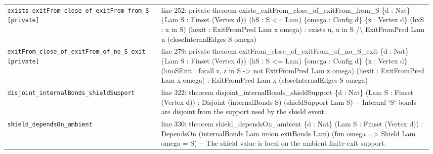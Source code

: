 \documentclass[10pt]{article}
\begin{document}
\begin{longtable}{>{\raggedright\arraybackslash}p{} >{\raggedright\arraybackslash}p{}}
\texttt{exists\_\allowbreak{}exitFrom\_\allowbreak{}close\_\allowbreak{}of\_\allowbreak{}exitFrom\_\allowbreak{}from\_\allowbreak{}S [private]} & {\ttfamily\scriptsize line 252:\allowbreak{} private theorem exists\_\allowbreak{}exitFrom\_\allowbreak{}close\_\allowbreak{}of\_\allowbreak{}exitFrom\_\allowbreak{}from\_\allowbreak{}S \{d :\allowbreak{} Nat\} \{Lam S :\allowbreak{} Finset (\allowbreak{}Vertex d)\allowbreak{}\} (\allowbreak{}hS :\allowbreak{} S <=\allowbreak{} Lam)\allowbreak{} \{omega :\allowbreak{} Config d\} \{x :\allowbreak{} Vertex d\} (\allowbreak{}hxS :\allowbreak{} x in S)\allowbreak{} (\allowbreak{}hexit :\allowbreak{} ExitFromPred Lam x omega)\allowbreak{} :\allowbreak{} exists u,\allowbreak{} u in S /\allowbreak{}\textbackslash{} ExitFromPred Lam u (\allowbreak{}closeInternalEdges S omega)\allowbreak{}} \\[0.45em]
\texttt{exitFrom\_\allowbreak{}close\_\allowbreak{}of\_\allowbreak{}exitFrom\_\allowbreak{}of\_\allowbreak{}no\_\allowbreak{}S\_\allowbreak{}exit [private]} & {\ttfamily\scriptsize line 279:\allowbreak{} private theorem exitFrom\_\allowbreak{}close\_\allowbreak{}of\_\allowbreak{}exitFrom\_\allowbreak{}of\_\allowbreak{}no\_\allowbreak{}S\_\allowbreak{}exit \{d :\allowbreak{} Nat\} \{Lam S :\allowbreak{} Finset (\allowbreak{}Vertex d)\allowbreak{}\} (\allowbreak{}hS :\allowbreak{} S <=\allowbreak{} Lam)\allowbreak{} \{omega :\allowbreak{} Config d\} \{x :\allowbreak{} Vertex d\} (\allowbreak{}hnoSExit :\allowbreak{} forall z,\allowbreak{} z in S -\allowbreak{}> not ExitFromPred Lam z omega)\allowbreak{} (\allowbreak{}hexit :\allowbreak{} ExitFromPred Lam x omega)\allowbreak{} :\allowbreak{} ExitFromPred Lam x (\allowbreak{}closeInternalEdges S omega)\allowbreak{}} \\[0.45em]
\texttt{disjoint\_\allowbreak{}internalBonds\_\allowbreak{}shieldSupport} & {\ttfamily\scriptsize line 322:\allowbreak{} theorem disjoint\_\allowbreak{}internalBonds\_\allowbreak{}shieldSupport \{d :\allowbreak{} Nat\} (\allowbreak{}Lam S :\allowbreak{} Finset (\allowbreak{}Vertex d)\allowbreak{})\allowbreak{} :\allowbreak{} Disjoint (\allowbreak{}internalBonds S)\allowbreak{} (\allowbreak{}shieldSupport Lam S)\allowbreak{} -\allowbreak{}-\allowbreak{} Internal `S`-\allowbreak{}bonds are disjoint from the support used by the shield event.\allowbreak{}} \\[0.45em]
\texttt{shield\_\allowbreak{}dependsOn\_\allowbreak{}ambient} & {\ttfamily\scriptsize line 330:\allowbreak{} theorem shield\_\allowbreak{}dependsOn\_\allowbreak{}ambient \{d :\allowbreak{} Nat\} (\allowbreak{}Lam S :\allowbreak{} Finset (\allowbreak{}Vertex d)\allowbreak{})\allowbreak{} :\allowbreak{} DependsOn (\allowbreak{}internalBonds Lam union exitBonds Lam)\allowbreak{} (\allowbreak{}fun omega =\allowbreak{}> Shield Lam omega =\allowbreak{} S)\allowbreak{} -\allowbreak{}-\allowbreak{} The shield value is local on the ambient finite exit support.\allowbreak{}} \\[0.45em]

\end{longtable}
\end{document}
